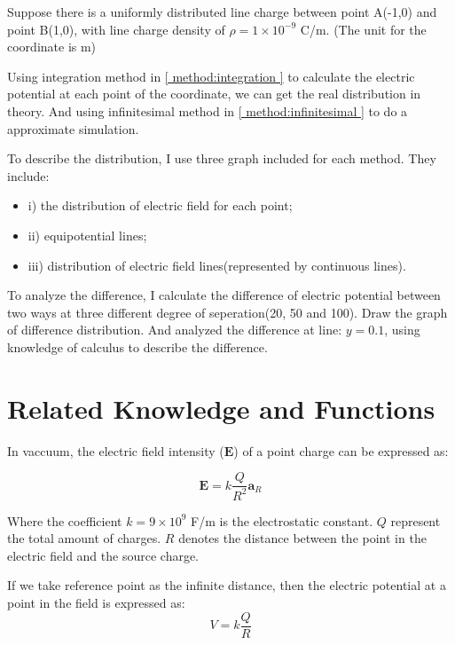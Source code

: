 \documentclass[10pt, journal, final]{IEEEtran}
\begin{document}
Suppose there is a uniformly distributed line charge
between point A(-1,0) and point B(1,0),
with line charge density of $\rho = 1 \times 10^{-9}$ C/m.
(The unit for the coordinate is m)\par

Using integration method in \ref{ method:integration }
to calculate the electric potential at each point of the coordinate,
we can get the real distribution in theory.
And using infinitesimal method in \ref{ method:infinitesimal }
to do a approximate simulation.\par

To describe the distribution, I use three graph included for each method.
They include:
\begin{itemize}
    \item i)   the distribution of electric field for each point;
    \item ii)  equipotential lines;
    \item iii) distribution of electric field lines(represented by continuous lines).
\end{itemize}\par
To analyze the difference, I calculate the difference of electric potential
between two ways at three different degree of seperation(20, 50 and 100).
Draw the graph of difference distribution.
And analyzed the difference at line: $y = 0.1$,
using knowledge of calculus to describe the difference.

\section{
  Related Knowledge and Functions
 }
\label{sec:Related and Func}

In vaccuum, the electric field intensity ($\mathbf{E}$)
of a point charge can be expressed as:

\begin{equation}
    \mathbf{E} = k\frac{Q}{R^2}\mathbf{a}_R
\end{equation}

Where the coefficient $k = 9 \times 10^9$ F/m is the electrostatic constant.
$Q$ represent the total amount of charges. $R$ denotes the distance
between the point in the electric field and the source charge.\par

If we take reference point as the infinite distance, then the electric potential at
a point in the field is expressed as:
\begin{equation}
    V = k \frac{Q}{R}
\end{equation}
\end{document}
